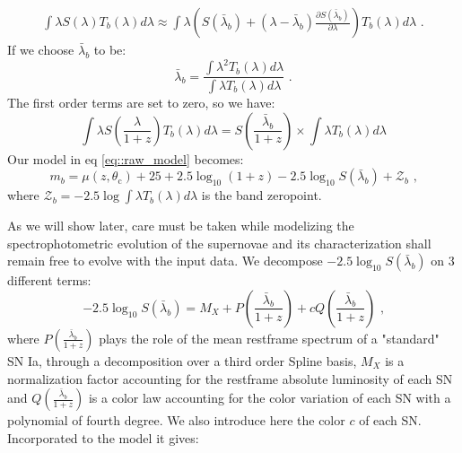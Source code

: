 \documentclass[\docopts]{\docclass}
\begin{document}
\begin{equation}
\begin{split}
\int \lambda S(\lambda) T_b(\lambda) d\lambda \approx \int \lambda \left( S(\bar\lambda_b ) +(\lambda - \bar\lambda_b )\frac{\partial S(\bar\lambda_b )}{\partial \lambda} \right) T_b(\lambda) d\lambda \text{ .}
\end{split}
\end{equation}
If we choose $\bar\lambda_b $ to be:
\begin{equation}
  \bar\lambda_b  = \frac{\int \lambda^2 T_b(\lambda) d\lambda}{\int \lambda T_b(\lambda) d\lambda} \text{ .}
\end{equation}
The first order terms are set to zero, so we have:
\begin{equation}
\int \lambda S(\frac{\lambda}{1+z}) T_b(\lambda) d\lambda = S(\frac{\bar\lambda_b }{1+z}) \times \int \lambda T_b(\lambda) d\lambda
\end{equation}
Our model in eq \ref{eq::raw_model} becomes:          
\begin{equation}
  m_b = \mu(z, \theta_\text{c}) + 25 + 2.5\log_{10}(1+z) - 2.5 \log_{10} S(\bar\lambda_b ) + \mathcal{Z}_b \text{ ,}
\end{equation}
where $\mathcal{Z}_b = -2.5 \log \int \lambda T_b(\lambda) d\lambda$ is the band zeropoint.

As we will show later, care must be taken while modelizing the spectrophotometric evolution of the supernovae and its characterization shall remain free to evolve with the input data.
We decompose $-2.5\log_{10}S(\bar\lambda_b)$ on 3 different terms:
\begin{equation}
-2.5\log_{10}S(\bar\lambda_b) = M_X + P(\frac{\bar\lambda_b}{1+z}) + cQ(\frac{\bar\lambda_b}{1+z}) \text{ ,}
\end{equation}
where $P(\frac{\bar\lambda_b}{1+z})$ plays the role of the mean restframe spectrum of a "standard" SN Ia, through a decomposition over a third order Spline basis, $M_X$ is a normalization factor accounting for the restframe absolute luminosity of each SN and $Q(\frac{\bar\lambda_b}{1+z})$ is a color law accounting for the color variation of each SN with a polynomial of fourth degree.
We also introduce here the color $c$ of each SN.
Incorporated to the model it gives:
\end{document}
